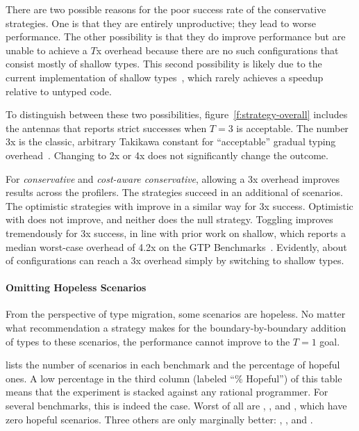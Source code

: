 There are two possible reasons for the poor success rate of the conservative
strategies.
One is that they are entirely unproductive; they lead to worse performance.
The other possibility is that they do improve performance but are unable
to achieve a $T$x overhead because there are no such configurations that
consist mostly of shallow types.
This second possibility is likely due to the current implementation of shallow
types~\cite{g-deep-shallow}, which rarely achieves a speedup relative to untyped
code.

To distinguish between these two possibilities,
figure~\ref{f:strategy-overall} includes the antennas that
reports strict successes when $T = 3$ is acceptable.  The
number 3x is the classic, arbitrary Takikawa constant for ``acceptable'' gradual typing
overhead~\cite{vss-popl-2017,bbst-oopsla-2017}.  Changing to 2x or 4x does not
significantly change the outcome.

For \emph{conservative} and \emph{cost-aware conservative}, allowing a 3x
overhead improves results across the profilers. The strategies succeed in an
additional  of scenarios.  The optimistic strategies with \statkw{}
improve in a similar way for 3x success.  Optimistic with \featkw{} does
not improve, and neither does the null strategy.  Toggling
improves tremendously for 3x success, in line with prior work on shallow, which
reports a median worst-case overhead of 4.2x on the GTP
Benchmarks~\cite{g-deep-shallow}.  Evidently, about  of configurations can
reach a 3x overhead simply by switching to shallow types.

\paragraph{Omitting Hopeless Scenarios} From the perspective of type
migration, some scenarios are hopeless. No matter what recommendation a strategy
makes for the boundary-by-boundary addition of types to these scenarios,
the performance cannot improve to the $T=1$ goal.

 lists the number of scenarios in each benchmark and the
percentage of hopeful ones. A low percentage in the third column (labeled ``\%
Hopeful'') of this table means that the experiment is stacked against any rational
programmer.  For several benchmarks, this is indeed the case.  Worst of all are
, , and , which have zero hopeful
scenarios.  Three others are only marginally better: ,
, and .

